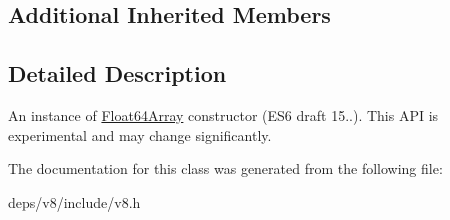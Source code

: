 \subsection*{Additional Inherited Members}


\subsection{Detailed Description}
An instance of \hyperlink{classv8_1_1_float64_array}{Float64\+Array} constructor (E\+S6 draft 15..). This A\+P\+I is experimental and may change significantly. 

The documentation for this class was generated from the following file\+:\begin{DoxyCompactItemize}
\item 
deps/v8/include/v8.\+h\end{DoxyCompactItemize}
